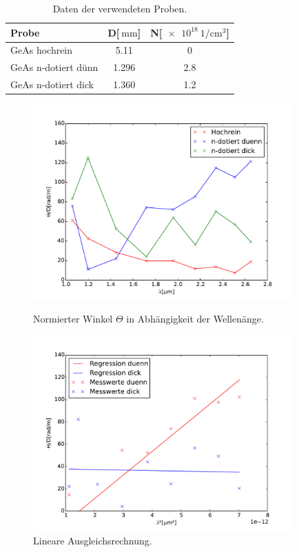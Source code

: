 \begin{table}
	\centering
	\caption{Daten der verwendeten Proben.}
	\begin{tabular}{l S[table-format=1.3] S[table-format=1.1]}
	\toprule
		Probe & {D[$\SI{}{\milli\meter}$]} & {N[$\SI{e18}{1\per\centi\meter^3}$]}\\ 
		\midrule
		GeAs hochrein & 5.11 & 0\\
		GeAs n-dotiert dünn & 1.296 & 2.8\\
		GeAs n-dotiert dick & 1.360 & 1.2\\
		\bottomrule
	\end{tabular}
	\label{data}
\end{table}

\begin{figure}
\centering
	\includegraphics[width = 10cm]{data/theta.pdf}
	\caption{Normierter Winkel $\Theta$ in Abhängigkeit der Wellenänge.}
	\label{theta}
	\includegraphics[width = 10cm]{data/fit.pdf}
	\caption{Lineare Ausgleichsrechnung.}
	\label{fit}
\end{figure}

